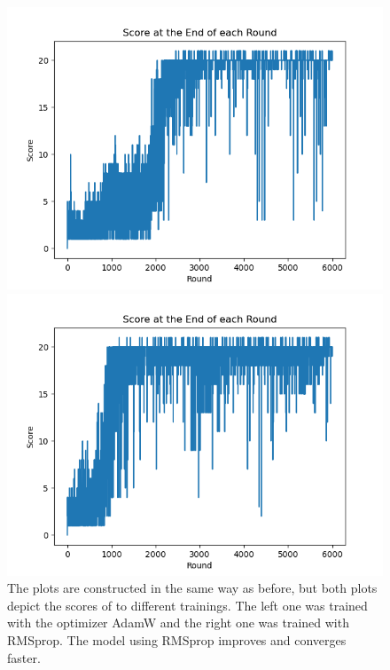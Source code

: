 \begin{figure}[H]
	\centering
	\begin{minipage}{0.49\textwidth}
		\centering
		\includegraphics[scale=0.52]{images/scores_adamw.png}
	\end{minipage}
	\begin{minipage}{0.49\textwidth}
		\centering
		\includegraphics[scale=0.52]{images/scores_rmsprop.png}
	\end{minipage}
	\caption{The plots are constructed in the same way as before, but both plots depict the scores of to different trainings. The left one was trained with the optimizer AdamW and the right one was trained with RMSprop. The model using RMSprop improves and converges faster.}
	\label{fig:adamvsrmsprop}
\end{figure}

